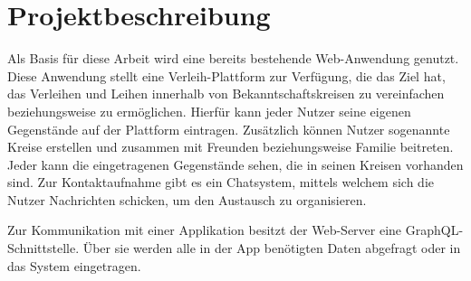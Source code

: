\section{Projektbeschreibung}
Als Basis für diese Arbeit wird eine bereits bestehende Web-Anwendung genutzt. Diese Anwendung stellt eine Verleih-Plattform zur Verfügung, die das Ziel hat, das Verleihen und Leihen innerhalb von Bekanntschaftskreisen zu vereinfachen beziehungsweise zu ermöglichen. Hierfür kann jeder Nutzer seine eigenen Gegenstände auf der Plattform eintragen. Zusätzlich können Nutzer sogenannte Kreise erstellen und zusammen mit Freunden beziehungsweise Familie beitreten. Jeder kann die eingetragenen Gegenstände sehen, die in seinen Kreisen vorhanden sind. Zur Kontaktaufnahme gibt es ein Chatsystem, mittels welchem sich die Nutzer Nachrichten schicken, um den Austausch zu organisieren. 

Zur Kommunikation mit einer Applikation besitzt der Web-Server eine GraphQL-Schnittstelle. Über sie werden alle in der App benötigten Daten abgefragt oder in das System eingetragen.